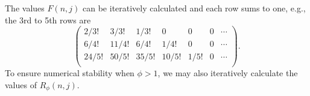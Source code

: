 \documentclass[journal]{IEEEtran}
\begin{document}
The values $F(n,j)$ can be iteratively calculated and each row sums to one, e.g.,
the 3rd to 5th rows are
\[ \left( \begin{array}{ccccccc}
2/3! & 3/3! & 1/3! & 0 & 0 & 0& \cdots \\
6/4! & 11/4! & 6/4! & 1/4! & 0 & 0& \cdots \\
24/5! & 50/5! & 35/5! & 10/5! & 1/5! & 0& \cdots \\
\end{array} \right).\]
To ensure numerical stability when $\phi>1$, we may also iteratively calculate the values of $R_\phi(n,j)$.



\small%



%
%
%





\end{document}
